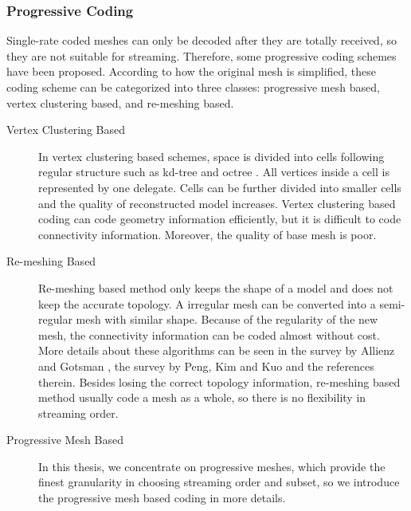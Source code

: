 \documentclass[11pt, a4paper]{report}
\begin{document}
    \subsubsection{Progressive Coding}
    Single-rate coded meshes can only be decoded after they are
    totally received, so they are not suitable for streaming. Therefore,
    some progressive coding schemes have been proposed. According to
    how the original mesh is simplified, these coding scheme can be
    categorized into three classes: progressive mesh based, vertex
    clustering based, and re-meshing based.
    
    \begin{description}
        \item[Vertex Clustering Based] 
            In vertex clustering based schemes, space is divided into cells
            following regular structure such as kd-tree \cite{566591} and 
            octree \cite{1073237}. All vertices inside a cell is represented
            by one delegate. Cells can be further divided into smaller cells
            and the quality of reconstructed model increases. Vertex clustering
            based coding can code geometry information efficiently, but it is 
            difficult to code connectivity information. Moreover, the quality
            of base mesh is poor.

        \item[Re-meshing Based]
            Re-meshing based method only keeps the shape of a model
            and does not keep the accurate topology. 
            A irregular mesh can be converted into a semi-regular mesh
            with similar shape. 
            Because of the regularity of the new mesh,
            the connectivity information can be coded almost without cost.
            More details about these algorithms can be seen in the survey by Allienz and Gotsman
            \cite{recent:alliez}, the survey by Peng, Kim and Kuo
            \cite{technologies:peng} and the references therein.
            Besides losing the correct topology information,
            re-meshing based method usually code a mesh as a whole, 
            so there is no flexibility in streaming order.

        \item[Progressive Mesh Based]
            In this thesis, we concentrate on progressive meshes, which provide 
            the finest granularity in choosing streaming order and subset, 
            so we introduce the progressive mesh based coding in more details.
    \end{description}
\end{document}
